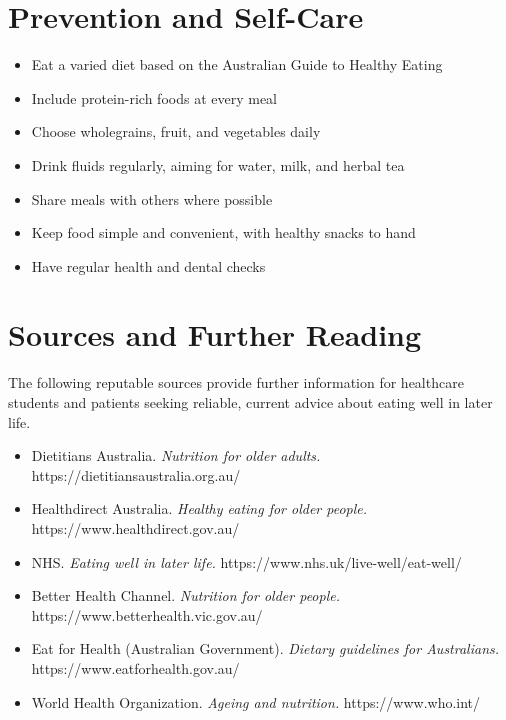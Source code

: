 \section*{Prevention and Self-Care}
\begin{itemize}
    \item Eat a varied diet based on the Australian Guide to Healthy Eating
    \item Include protein-rich foods at every meal
    \item Choose wholegrains, fruit, and vegetables daily
    \item Drink fluids regularly, aiming for water, milk, and herbal tea
    \item Share meals with others where possible
    \item Keep food simple and convenient, with healthy snacks to hand
    \item Have regular health and dental checks
\end{itemize}

\section*{Sources and Further Reading}
The following reputable sources provide further information for healthcare students and patients seeking reliable, current advice about eating well in later life.
\begin{itemize}
    \item Dietitians Australia. \textit{Nutrition for older adults.} https://dietitiansaustralia.org.au/
    \item Healthdirect Australia. \textit{Healthy eating for older people.} https://www.healthdirect.gov.au/
    \item NHS. \textit{Eating well in later life.} https://www.nhs.uk/live-well/eat-well/
    \item Better Health Channel. \textit{Nutrition for older people.} https://www.betterhealth.vic.gov.au/
    \item Eat for Health (Australian Government). \textit{Dietary guidelines for Australians.} https://www.eatforhealth.gov.au/
    \item World Health Organization. \textit{Ageing and nutrition.} https://www.who.int/
\end{itemize}
